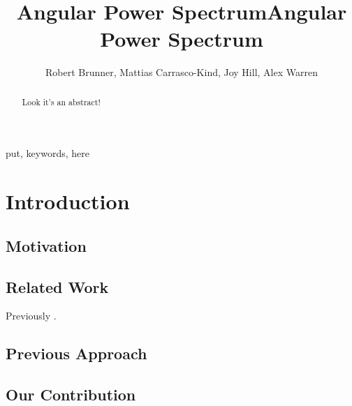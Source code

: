 \documentclass[5p]{elsarticle}
\title{Angular Power Spectrum}
\begin{document}
\begin{frontmatter}

\title{Angular Power Spectrum}

\author{Robert Brunner, Mattias Carrasco-Kind, Joy Hill, Alex Warren}
\address{University of Illinois Urbana-Champaign}




\begin{abstract}
Look it's an abstract!
\end{abstract}

\begin{keyword}
put, keywords, here
\end{keyword}

\end{frontmatter}

\linenumbers

\section{Introduction}

\subsection{Motivation}

\subsection{Related Work}
Previously \cite{hayes2012sdss}.

\subsection{Previous Approach}

\subsection{Our Contribution}
\end{document}
